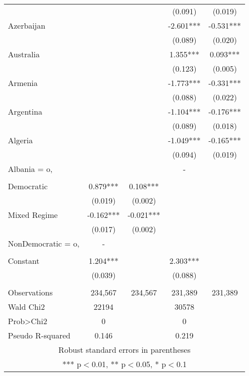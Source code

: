 \documentclass[]{article}
\begin{document}
\begin{tabular}{lcccc}
 &  &  & (0.091) & (0.019) \\
Azerbaijan &  &  & -2.601*** & -0.531*** \\
 &  &  & (0.089) & (0.020) \\
Australia &  &  & 1.355*** & 0.093*** \\
 &  &  & (0.123) & (0.005) \\
Armenia &  &  & -1.773*** & -0.331*** \\
 &  &  & (0.088) & (0.022) \\
Argentina &  &  & -1.104*** & -0.176*** \\
 &  &  & (0.089) & (0.018) \\
Algeria &  &  & -1.049*** & -0.165*** \\
 &  &  & (0.094) & (0.019) \\
Albania = o, &  &  & - &  \\
 &  &  &  &  \\
Democratic & 0.879*** & 0.108*** &  &  \\
 & (0.019) & (0.002) &  &  \\
Mixed Regime & -0.162*** & -0.021*** &  &  \\
 & (0.017) & (0.002) &  &  \\
NonDemocratic = o, & - &  &  &  \\
 &  &  &  &  \\
Constant & 1.204*** &  & 2.303*** &  \\
 & (0.039) &  & (0.088) &  \\
 &  &  &  &  \\
Observations & 234,567 & 234,567 & 231,389 & 231,389 \\
Wald Chi2 & 22194 &  & 30578 &  \\
Prob>Chi2 & 0 &  & 0 &  \\
 Pseudo R-squared & 0.146 &  & 0.219 &  \\ \hline
\multicolumn{5}{c}{ Robust standard errors in parentheses} \\
\multicolumn{5}{c}{ *** p$<$0.01, ** p$<$0.05, * p$<$0.1} \\
\end{tabular}
\end{document}
